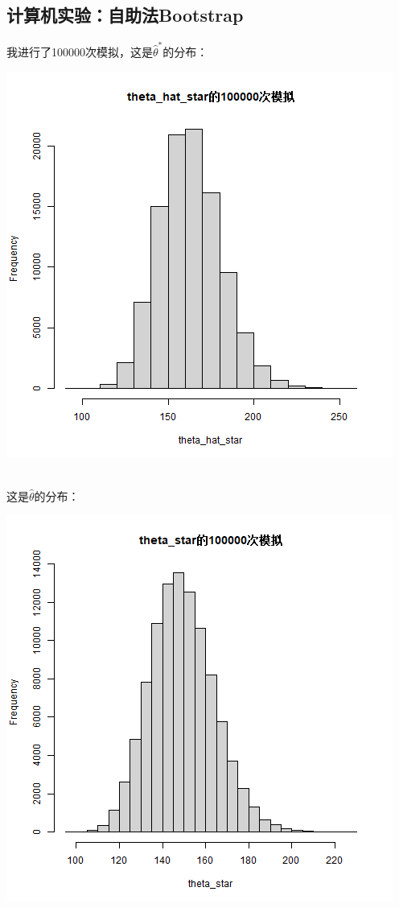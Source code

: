 \documentclass{article}
\begin{document}
\begin{CJK}{UTF8}{gbsn}
\section{计算机实验：自助法Bootstrap}
我进行了100000次模拟，这是$\hat{\theta}^{*}$的分布：\\
\begin{minipage}{0.5\textwidth}
    \includegraphics[scale=0.6]{bootstrap.png}
\end{minipage}
\\
这是$\hat{\theta}$的分布：\\
\begin{minipage}{0.5\textwidth}
    \includegraphics[scale=0.6]{bootstrap0.png}

\end{minipage}
\end{CJK}
\end{document}

